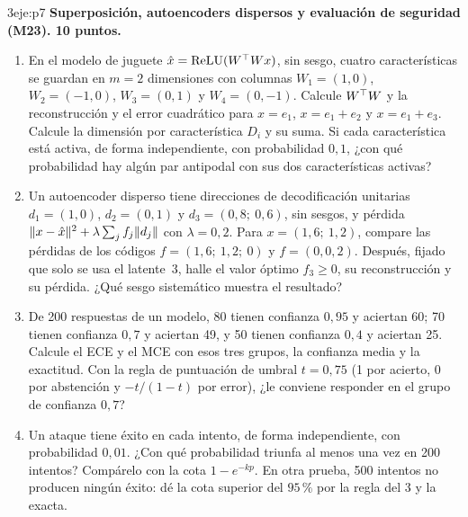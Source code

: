 \begin{ejercicio}{3}{eje:p7}
\textbf{Superposición, autoencoders dispersos y evaluación de seguridad (M23). 10 puntos.}
\begin{enumerate}[label=(\alph*)]
  \item {} En el modelo de juguete $\hat x=\operatorname{ReLU}(W^{\top} Wx)$, sin sesgo, cuatro características se guardan en $m=2$ dimensiones con columnas $W_1=(1,0)$, $W_2=(-1,0)$, $W_3=(0,1)$ y $W_4=(0,-1)$. Calcule $W^{\top} W$ y la reconstrucción y el error cuadrático para $x=e_1$, $x=e_1+e_2$ y $x=e_1+e_3$. Calcule la dimensión por característica $D_i$ y su suma. Si cada característica está activa, de forma independiente, con probabilidad $0{,}1$, ¿con qué probabilidad hay algún par antipodal con sus dos características activas?
  \item {} Un autoencoder disperso tiene direcciones de decodificación unitarias $d_1=(1,0)$, $d_2=(0,1)$ y $d_3=(0{,}8;\ 0{,}6)$, sin sesgos, y pérdida $\lVert x-\hat x\rVert^{2}+\lambda\sum_jf_j\lVert d_j\rVert$ con $\lambda=0{,}2$. Para $x=(1{,}6;\ 1{,}2)$, compare las pérdidas de los códigos $f=(1{,}6;\ 1{,}2;\ 0)$ y $f=(0,0,2)$. Después, fijado que solo se usa el latente~3, halle el valor óptimo $f_3\ge 0$, su reconstrucción y su pérdida. ¿Qué sesgo sistemático muestra el resultado?
  \item {} De 200 respuestas de un modelo, 80 tienen confianza $0{,}95$ y aciertan 60; 70 tienen confianza $0{,}7$ y aciertan 49, y 50 tienen confianza $0{,}4$ y aciertan 25. Calcule el ECE y el MCE con esos tres grupos, la confianza media y la exactitud. Con la regla de puntuación de umbral $t=0{,}75$ (1 por acierto, 0 por abstención y $-t/(1-t)$ por error), ¿le conviene responder en el grupo de confianza $0{,}7$?
  \item {} Un ataque tiene éxito en cada intento, de forma independiente, con probabilidad $0{,}01$. ¿Con qué probabilidad triunfa al menos una vez en 200 intentos? Compárelo con la cota $1-e^{-kp}$. En otra prueba, 500 intentos no producen ningún éxito: dé la cota superior del $95\,\%$ por la regla del 3 y la exacta.
\end{enumerate}
\end{ejercicio}
